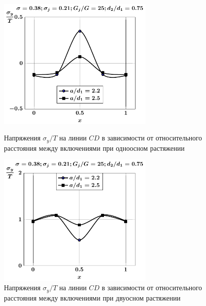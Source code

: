 \begin{russian}
\begin{figure}[h!]
\centering\footnotesize
\parbox[b]{7.5cm}{\centering\includegraphics[width=7.6cm]{inc13-a-d75-g25-t1-sig_y-cd.pdf}
\caption{Напряжения $\sigma_y/T$ на линии $CD$ в зависимости от относительного расстояния между включениями при одноосном растяжении
\label{f:9:83}}}\hfil\hfil
\parbox[b]{7.5cm}{\centering\includegraphics[width=7.6cm]{inc13-a-d75-g25-t2-sig_y-cd.pdf}
\caption{Напряжения $\sigma_y/T$ на линии $CD$ в зависимости от относительного расстояния между включениями при двуосном растяжении
\label{f:9:84}}}
\end{figure}


\end{russian}

